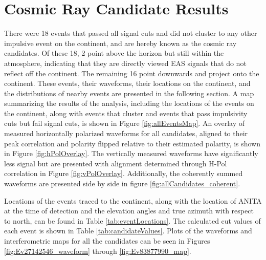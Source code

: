 		

\section{Cosmic Ray Candidate Results}
	There were 18 events that passed all signal cuts and did not cluster to any other impulsive event on the continent, and are hereby known as the cosmic ray candidates.  Of these 18, 2 point above the horizon but still within the atmosphere, indicating that they are directly viewed EAS signals that do not reflect off the continent.  The remaining 16 point downwards and project onto the continent.  These events, their waveforms, their locations on the continent, and the distributions of nearby events  are presented in the following section.  A map summarizing the results of the analysis, including the locations of the events on the continent, along with events that cluster and events that pass impulsivity cuts but fail signal cuts, is shown in Figure \ref{fig:allEventsMap}. An overlay of measured horizontally polarized waveforms for all candidates, aligned to their peak correlation and polarity flipped relative to their estimated polarity, is shown in Figure \ref{fig:hPolOverlay}.  The vertically measured waveforms have significantly less signal but are presented with alignment determined through H-Pol correlation in Figure \ref{fig:vPolOverlay}.  Additionally, the coherently summed waveforms are presented side by side in figure \ref{fig:allCandidates_coherent}.
	
	Locations of the events traced to the continent, along with the location of ANITA at the time of detection and the elevation angles and true azimuth with respect to north, can be found in Table \ref{tab:eventLocations}.  The calculated cut values of each event is shown in Table \ref{tab:candidateValues}.  Plots of the waveforms and interferometric maps for all the candidates can be seen in Figures \ref{fig:Ev27142546_waveform} through \ref{fig:Ev83877990_map}.
	

